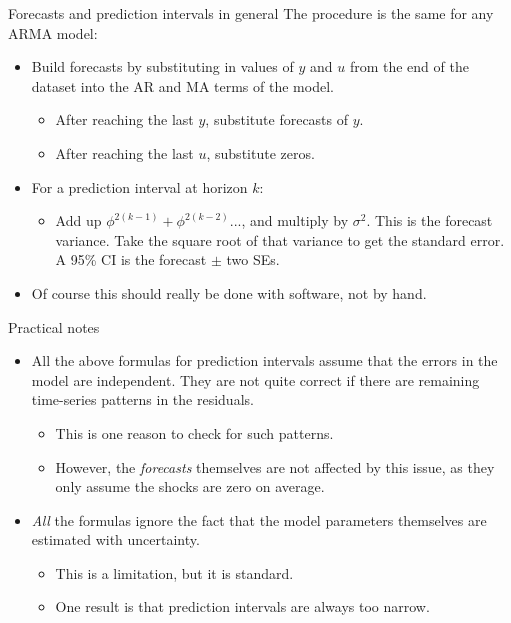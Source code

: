 \documentclass[t,12pt]{beamer}
\begin{document}
\begin{frame}[c]{Forecasts and prediction intervals in general}
The procedure is the same for any ARMA model:
\begin{itemize}
\smallskip
\item Build forecasts by substituting in values of $y$ and $u$ from the end of the dataset into the AR and MA terms of the model. 
\begin{itemize}
\item After reaching the last $y$, substitute forecasts of $y$.
\item After reaching the last $u$, substitute zeros.
\end{itemize}
\smallskip
\item For a prediction interval at horizon $k$:
\begin{itemize}
\item Add up $\phi^{2(k-1)} + \phi^{2(k-2)} ... $, and multiply by $\sigma^2$. 
This is the forecast variance.
Take the square root of that variance to get the standard error. A 95\% CI is the forecast $\pm$ two SEs.
\end{itemize}
\smallskip
\item Of course this should really be done with software, not by hand.
\end{itemize}
\end{frame}

\begin{frame}[c]{Practical notes}
\begin{itemize}
\item All the above formulas for prediction intervals assume that the errors in the model are independent.
They are not quite correct if there are remaining time-series patterns in the residuals.
\begin{itemize}
\item 
This is one reason to check for such patterns. 
\item However, the \emph{forecasts} themselves are not affected by this issue, as they only assume the shocks are zero on average.
\end{itemize}
\medskip
\item \emph{All} the formulas ignore the fact that the model parameters themselves are estimated with uncertainty.
\begin{itemize}
\item This is a limitation, but it is standard. 
\item One result is that prediction intervals are always too narrow.
\end{itemize}
\end{itemize}
\end{frame}
\end{document}
